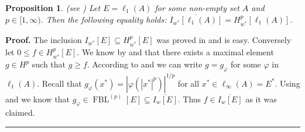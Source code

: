 \documentclass[12pt]{article}%
\newtheorem{proposition}[theorem]{Proposition}
\newenvironment{proof}[1][Proof]{\noindent\textbf{#1.} }{\ \rule{0.5em}{0.5em}}
\begin{document}
\begin{proposition}
(see \cite[Propositoin 4.5]{L-968}) Let $E=\ell_{1}\left(  A\right)  $ for
some non-empty set $A$ and $p\in\lbrack1,\infty).$ Then the following equality
holds: $\overline{I_{w^{\ast}}\left[  \ell_{1}\left(  A\right)  \right]
}=H_{w^{\ast}}^{p}\left[  \ell_{1}\left(  A\right)  \right]  .$
\end{proposition}

\begin{proof}
The inclusion $I_{w^{\ast}}\left[  E\right]  \subseteq H_{w^{\ast}}^{p}\left[
E\right]  $ was proved in \cite{L-968} and is easy. Conversely let $0\leq f\in
H_{w^{\ast}}^{p}\left[  E\right]  .$ We know by \cite[Lemma 4.4]{L-403} and
\cite[Lemma 4.3]{L-979} that there exists a maximal element $g\in H^{p}$ such
that $g\geq f$. According to \cite[Lemmas 4.7 and 4.9]{L-403} and \cite[Lemmas
4.6 and 4.8]{L-979} we can write $g=g_{\varphi}$ for some $\varphi$ in
$\ell_{1}\left(  A\right)  .$ Recall that $g_{\varphi}\left(  x^{\ast}\right)
=\left\vert \varphi\left(  \left\vert x^{\ast}\right\vert ^{p}\right)
\right\vert ^{1/p}$ for all $x^{\ast}\in\ell_{\infty}\left(  A\right)
=E^{\ast}.$ Using \cite[Lemma 4.8]{L-403} and \cite[Lemma 4.7]{L-979} we know
that $g_{\varphi}\in\operatorname*{FBL}\nolimits^{(p)}\left[  E\right]
\subseteq\overline{I_{w}\left[  E\right]  }.$ Thus $f\in\overline{I_{w}\left[
E\right]  }$ as it was claimed.
\end{proof}
\end{document}
